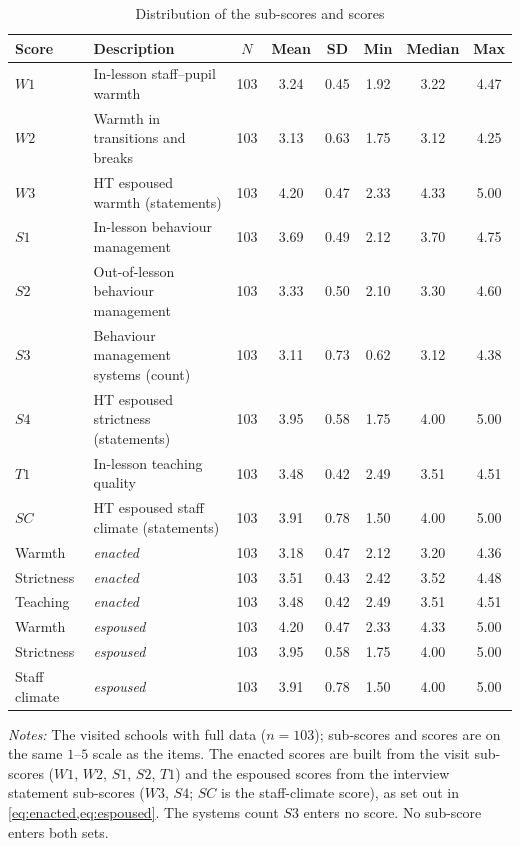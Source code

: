 \begin{table}[htbp]
\centering
\caption{Distribution of the sub-scores and scores}
\label{tab:score_dist}
\footnotesize\setlength{\tabcolsep}{4pt}
\begin{tabular}{llcccccc}
\toprule
Score & Description & $N$ & Mean & SD & Min & Median & Max \\
\midrule
$W1$ & In-lesson staff--pupil warmth & 103 & 3.24 & 0.45 & 1.92 & 3.22 & 4.47 \\
$W2$ & Warmth in transitions and breaks & 103 & 3.13 & 0.63 & 1.75 & 3.12 & 4.25 \\
$W3$ & HT espoused warmth (statements) & 103 & 4.20 & 0.47 & 2.33 & 4.33 & 5.00 \\
$S1$ & In-lesson behaviour management & 103 & 3.69 & 0.49 & 2.12 & 3.70 & 4.75 \\
$S2$ & Out-of-lesson behaviour management & 103 & 3.33 & 0.50 & 2.10 & 3.30 & 4.60 \\
$S3$ & Behaviour management systems (count) & 103 & 3.11 & 0.73 & 0.62 & 3.12 & 4.38 \\
$S4$ & HT espoused strictness (statements) & 103 & 3.95 & 0.58 & 1.75 & 4.00 & 5.00 \\
$T1$ & In-lesson teaching quality & 103 & 3.48 & 0.42 & 2.49 & 3.51 & 4.51 \\
$SC$ & HT espoused staff climate (statements) & 103 & 3.91 & 0.78 & 1.50 & 4.00 & 5.00 \\
\midrule
Warmth & \emph{enacted} & 103 & 3.18 & 0.47 & 2.12 & 3.20 & 4.36 \\
Strictness & \emph{enacted} & 103 & 3.51 & 0.43 & 2.42 & 3.52 & 4.48 \\
Teaching & \emph{enacted} & 103 & 3.48 & 0.42 & 2.49 & 3.51 & 4.51 \\
Warmth & \emph{espoused} & 103 & 4.20 & 0.47 & 2.33 & 4.33 & 5.00 \\
Strictness & \emph{espoused} & 103 & 3.95 & 0.58 & 1.75 & 4.00 & 5.00 \\
Staff climate & \emph{espoused} & 103 & 3.91 & 0.78 & 1.50 & 4.00 & 5.00 \\
\bottomrule
\end{tabular}
\begin{minipage}{\textwidth}\vspace{0.5em}\footnotesize
\textit{Notes:} The visited schools with full data ($n = 103$); sub-scores and scores are on the same $1$--$5$ scale as the items. The enacted scores are built from the visit sub-scores
($W1$, $W2$, $S1$, $S2$, $T1$) and the espoused scores from the interview
statement sub-scores ($W3$, $S4$; $SC$ is the staff-climate score), as set
out in \cref{eq:enacted,eq:espoused}. The systems count $S3$ enters no
score. No sub-score enters both sets.
\end{minipage}
\end{table}

